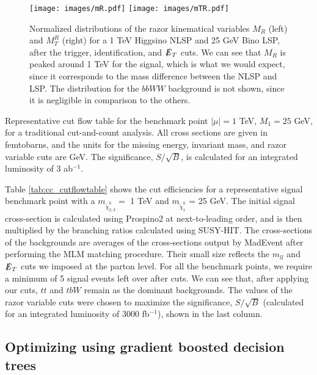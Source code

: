 \begin{figure}[h]
\centering
\texttt{[image: images/mR.pdf]}
\texttt{[image: images/mTR.pdf]}
\caption{Normalized distributions of the razor kinematical variables $M_R$ (left) and $M_T^R$ (right) for a 1 TeV Higgsino NLSP and 25 GeV Bino LSP, after the trigger, identification, and $\slashed{E}_{T}$ cuts. We can see that $M_R$ is peaked around 1 TeV for the signal, which is what we would expect, since it corresponds to the mass difference between the NLSP and LSP. The distribution for the $bbWW$ background is not shown, since it is negligible in comparison to the others.}
\label{fig:razor_histos}
\end{figure}

\begin{table}[h]
  \centering
  
  \caption{Representative cut flow table for the benchmark point $|\mu|=1$ TeV, $M_1 = 25$ GeV, for a traditional cut-and-count analysis. All cross sections are given in femtobarns, and the units for the missing energy, invariant mass, and razor variable cuts are GeV. The significance, $S/\sqrt{B}$, is calculated for an integrated luminosity of 3 ab$^{-1}$.}
\label{tab:cc_cutflowtable}
\end{table}

Table \ref{tab:cc_cutflowtable} shows the cut efficiencies for a representative signal benchmark point with a $m_{\tilde{\chi}_{2,3}^0} = $ 1 TeV and $m_{\tilde{\chi}_{1}^0}$ = 25 GeV. The initial signal cross-section is calculated using Prospino2 at next-to-leading order, and is then multiplied by the branching ratios calculated using SUSY-HIT. The cross-sections of the backgrounds are averages of the cross-sections output by MadEvent after performing the MLM matching procedure. Their small size reflects the $m_{ll}$ and $\slashed{E}_T$ cuts we imposed at the parton level. For all the benchmark points, we require a minimum of 5 signal events left over after cuts. We can see that, after applying our cuts, $tt$ and $tbW$ remain as the dominant backgrounds. The values of the razor variable cuts were chosen to maximize the significance, $S/\sqrt{B}$ (calculated for an integrated luminosity of 3000 fb$^{-1}$), shown in the last column.

\subsection{Optimizing using gradient boosted decision trees}\label{subsec:bdt}

